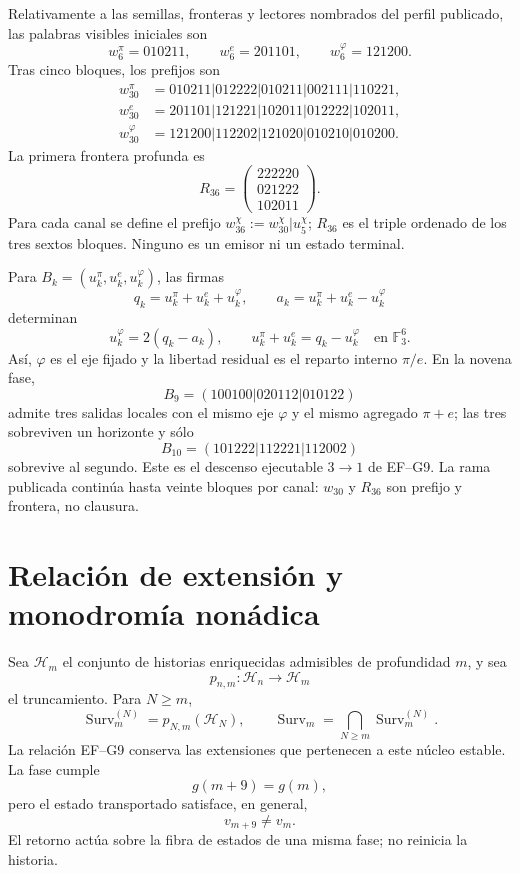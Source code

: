 Relativamente a las semillas, fronteras y lectores nombrados del perfil
publicado, las palabras visibles iniciales son
\[
 w_6^\pi=010211,\qquad w_6^e=201101,\qquad
 w_6^\varphi=121200.
\]
Tras cinco bloques, los prefijos son
\[
\begin{aligned}
w_{30}^{\pi}&=010211|012222|010211|002111|110221,\\
w_{30}^{e}&=201101|121221|102011|012222|102011,\\
w_{30}^{\varphi}&=121200|112202|121020|010210|010200.
\end{aligned}
\]
La primera frontera profunda es
\[
 R_{36}=
 \begin{pmatrix}222220\\021222\\102011\end{pmatrix}.
\]
Para cada canal se define el prefijo
\(w_{36}^\chi:=w_{30}^\chi|u_5^\chi\); \(R_{36}\) es el triple ordenado de
los tres sextos bloques. Ninguno es un emisor ni un estado terminal.

Para \(B_k=(u_k^\pi,u_k^e,u_k^\varphi)\), las firmas
\[
 q_k=u_k^\pi+u_k^e+u_k^\varphi,\qquad
 a_k=u_k^\pi+u_k^e-u_k^\varphi
\]
determinan
\[
 u_k^\varphi=2(q_k-a_k),\qquad
 u_k^\pi+u_k^e=q_k-u_k^\varphi
 \quad\text{en }\mathbb F_3^6.
\]
As\'i, \(\varphi\) es el eje fijado y la libertad residual es el reparto
interno \(\pi/e\). En la novena fase,
\[
 B_9=(100100|020112|010122)
\]
admite tres salidas locales con el mismo eje \(\varphi\) y el mismo agregado
\(\pi+e\); las tres sobreviven un horizonte y s\'olo
\[
 B_{10}=(101222|112221|112002)
\]
sobrevive al segundo. Este es el descenso ejecutable \(3\to1\) de EF--G9.
La rama publicada contin\'ua hasta veinte bloques por canal: \(w_{30}\) y
\(R_{36}\) son prefijo y frontera, no clausura.

\section{Relación de extensión y monodromía nonádica}
\label{sec:extension-monodromia-tpk}

Sea \(\mathcal H_m\) el conjunto de historias enriquecidas admisibles de
profundidad \(m\), y sea
\[
 p_{n,m}:\mathcal H_n\longrightarrow\mathcal H_m
\]
el truncamiento. Para \(N\geq m\),
\[
 \operatorname{Surv}_m^{(N)}=p_{N,m}(\mathcal H_N),
 \qquad
 \operatorname{Surv}_m=\bigcap_{N\geq m}\operatorname{Surv}_m^{(N)}.
\]
La relaci\'on EF--G9 conserva las extensiones que pertenecen a este n\'ucleo
estable. La fase cumple
\[
 g(m+9)=g(m),
\]
pero el estado transportado satisface, en general,
\[
 v_{m+9}\ne v_m.
\]
El retorno act\'ua sobre la fibra de estados de una misma fase; no reinicia la
historia.

